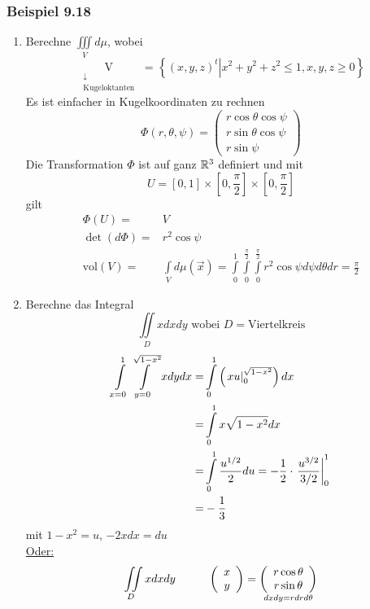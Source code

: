 \subsubsection*{Beispiel 9.18}
\begin{enumerate}
\item Berechne $\iiint\limits_V d\mu$, wobei \[\mathop {\text{V}}\limits_{\begin{array}{*{20}{c}}
 \downarrow \\
{{\text{Kugeloktanten}}}
\end{array}} {\text{ = }}\left\{ {\left. {{{\left( {x,y,z} \right)}^t}} \right|{x^2} + {y^2} + {z^2} \le 1,x,y,z \ge 0} \right\}\] Es ist einfacher in Kugelkoordinaten zu rechnen
\[\Phi \left( {r,\theta ,\psi } \right) = \left( {\begin{array}{*{20}{c}}
{r\cos \theta \cos \psi }\\
{r\sin \theta \cos \psi }\\
{r\sin \psi }
\end{array}} \right)\]
Die Transformation $\Phi$ ist auf ganz $\mathbb{R}^3$ definiert und mit \[U = \left[ {0,1} \right] \times \left[ {0,\frac{\pi }{2}} \right] \times \left[ {0,\frac{\pi }{2}} \right]\]
gilt
\begin{align*}
\Phi\left( U\right) =&V\\
\det\left( d\Phi\right)=&r^2\cos\psi\\
\text{vol}\left(V\right)=&\int\limits_{V} d\mu\left( \vec x\right)=\int\limits_0^1\int\limits_0^{\frac{\pi}{2}}\int\limits_0^{\frac{\pi}{2}} r^2\cos\psi d\psi d\theta dr=\frac{\pi}{2}
\end{align*}
\item Berechne das Integral
\[ \iint\limits_D x dx dy\text{ wobei $D=$Viertelkreis}\]
\begin{align*}
\int\limits_{x = 0}^1 {\int\limits_{y = 0}^{\sqrt {1 - {x^2}} } x } dydx =&\int\limits_0^1 {\left( {\left. {xu} \right|_0^{\sqrt {1 - {x^2}} }} \right)dx} \\
=&\int\limits_0^1 x\sqrt{1-x^2}dx\\
=&\int\limits_0^1 {\frac{{{u^{{1 \mathord{\left/
 {\vphantom {1 2}} \right.
 \kern-\nulldelimiterspace} 2}}}}}{2}} du =  - \frac{1}{2} \cdot \left. {\frac{{{u^{{3 \mathord{\left/
 {\vphantom {3 2}} \right.
 \kern-\nulldelimiterspace} 2}}}}}{{{3 \mathord{\left/
 {\vphantom {3 2}} \right.
 \kern-\nulldelimiterspace} 2}}}} \right|_0^1\\
=&-\frac{1}{3}
\end{align*}
mit $1-x^2=u$, $-2xdx=du$\\
\underline{Oder:}\\
\[ \iint\limits_D x dx dy \hspace{10mm}\left( {\begin{array}{*{20}{c}}
x\\
y
\end{array}} \right) = \mathop {\left( {\begin{array}{*{20}{c}}
{r\cos \theta }\\
{r\sin \theta }
\end{array}} \right)}\limits_{dxdy = rdrd\theta } \]


\end{enumerate}
